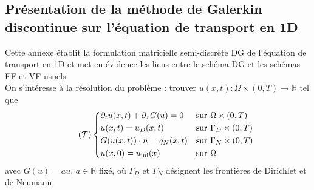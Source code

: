 \documentclass[11pt, a4paper, oneside]{report}
\begin{document}
\begin{appendices}

\renewcommand{\appendixtocname}{Annexes}
\renewcommand{\chaptername}{Annexe}


\chapter{Présentation de la méthode de Galerkin discontinue sur l'équation de transport en 1D}
\label{annexe:DG_1D}

Cette annexe établit la formulation matricielle semi-discrète DG de l'équation de transport en 1D et met en évidence les liens entre le schéma DG et les schémas EF et VF usuels. \\

On s'intéresse à la résolution du problème : trouver $u(x, t) : \Omega \times (0, T) \longrightarrow \mathbb{R}$ tel que
\begin{equation} \tag{$\mathcal{T}$} \label{eq:Transport_forte}
    \left \{
    \begin{aligned}
        &\partial_t u(x, t) + \partial_x G(u) = 0   &&\text{sur } \Omega \times (0, T) \\
        &u(x, t) = u_D(x, t)                        &&\text{sur } \Gamma_D \times (0, T) \\
        &G(u(x,t)) \cdot n = q_N(x, t)              &&\text{sur } \Gamma_N \times (0, T) \\
        &u(x, 0) = u_\text{ini}(x)                  &&\text{sur } \Omega
    \end{aligned}
    \right .
\end{equation}
avec $G(u) = au$, $a \in \mathbb{R}$ fixé, où $\Gamma_D$ et $\Gamma_N$ désignent les frontières de Dirichlet et de Neumann. \\


\end{appendices}
\end{document}
